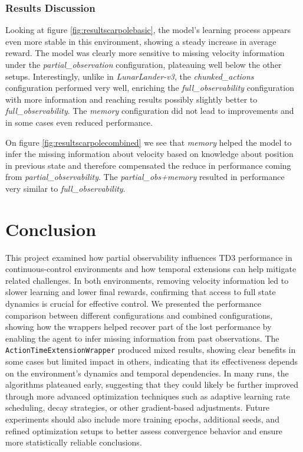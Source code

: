 \documentclass[12pt, a4paper]{article}
\begin{document}
\subsubsection{Results Discussion}
Looking at figure \ref{fig:resultscarpolebasic}, the model’s learning process appears even more stable in this environment, showing a steady increase in average reward. The model was clearly more sensitive to missing velocity information under the \textit{partial\_observation} configuration, plateauing well below the other setups. Interestingly, unlike in \textit{LunarLander-v3}, the \textit{chunked\_actions} configuration performed very well, enriching the \textit{full\_observability} configuration with more information and reaching results possibly slightly better to \textit{full\_observability}. The \textit{memory} configuration did not lead to improvements and in some cases even reduced performance. \newline

On figure  \ref{fig:resultscarpolecombined} we see that \textit{memory} helped the model to infer the missing information about velocity based on knowledge about position in previous state and therefore compensated the reduce in performance coming from \textit{partial\_observability}. The \textit{partial\_obs+memory} resulted in performance very similar to \textit{full\_observability}.



\section{Conclusion}

This project examined how partial observability influences TD3 performance in continuous-control environments and how temporal extensions can help mitigate related challenges. In both environments, removing velocity information led to slower learning and lower final rewards, confirming that access to full state dynamics is crucial for effective control. We presented the performance comparison between different configurations and combined configurations, showing how the wrappers helped recover part of the lost performance by enabling the agent to infer missing information from past observations. The \texttt{ActionTimeExtensionWrapper} produced mixed results, showing clear benefits in some cases but limited impact in others, indicating that its effectiveness depends on the environment’s dynamics and temporal dependencies. In many runs, the algorithms plateaued early, suggesting that they could likely be further improved through more advanced optimization techniques such as adaptive learning rate scheduling, decay strategies, or other gradient-based adjustments. Future experiments should also include more training epochs, additional seeds, and refined optimization setups to better assess convergence behavior and ensure more statistically reliable conclusions.
\end{document}
